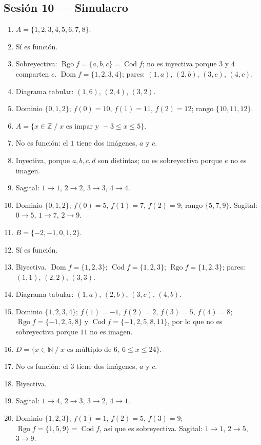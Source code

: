 \documentclass[12pt, letterpaper]{article}
\newcommand{\N}{\mathbb{N}}
\newcommand{\Z}{\mathbb{Z}}
\begin{document}
\subsection*{Sesión 10 — Simulacro}
\begin{enumerate}[leftmargin=*, label=\textbf{\arabic*.}]
  \item $A=\{1,2,3,4,5,6,7,8\}$.
  \item Sí es función.
  \item Sobreyectiva: $\operatorname{Rgo} f=\{a,b,c\}=\operatorname{Cod} f$; no es inyectiva porque $3$ y $4$ comparten $c$. $\operatorname{Dom} f=\{1,2,3,4\}$; pares: $(1,a)$, $(2,b)$, $(3,c)$, $(4,c)$.
  \item Diagrama tabular: $(1,6)$, $(2,4)$, $(3,2)$.
  \item Dominio $\{0,1,2\}$; $f(0)=10$, $f(1)=11$, $f(2)=12$; rango $\{10,11,12\}$.
  \item $A=\{x\in\Z \;/\; x \text{ es impar y } -3\le x\le 5\}$.
  \item No es función: el $1$ tiene dos imágenes, $a$ y $c$.
  \item Inyectiva, porque $a,b,c,d$ son distintas; no es sobreyectiva porque $e$ no es imagen.
  \item Sagital: $1\to1$, $2\to2$, $3\to3$, $4\to4$.
  \item Dominio $\{0,1,2\}$; $f(0)=5$, $f(1)=7$, $f(2)=9$; rango $\{5,7,9\}$. Sagital: $0\to5$, $1\to7$, $2\to9$.
  \item $B=\{-2,-1,0,1,2\}$.
  \item Sí es función.
  \item Biyectiva. $\operatorname{Dom} f=\{1,2,3\}$; $\operatorname{Cod} f=\{1,2,3\}$; $\operatorname{Rgo} f=\{1,2,3\}$; pares: $(1,1)$, $(2,2)$, $(3,3)$.
  \item Diagrama tabular: $(1,a)$, $(2,b)$, $(3,c)$, $(4,b)$.
  \item Dominio $\{1,2,3,4\}$; $f(1)=-1$, $f(2)=2$, $f(3)=5$, $f(4)=8$; $\operatorname{Rgo} f=\{-1,2,5,8\}$ y $\operatorname{Cod} f=\{-1,2,5,8,11\}$, por lo que no es sobreyectiva porque $11$ no es imagen.
  \item $D=\{x\in\N \;/\; x \text{ es múltiplo de } 6,\ 6\le x\le 24\}$.
  \item No es función: el $3$ tiene dos imágenes, $a$ y $c$.
  \item Biyectiva.
  \item Sagital: $1\to4$, $2\to3$, $3\to2$, $4\to1$.
  \item Dominio $\{1,2,3\}$; $f(1)=1$, $f(2)=5$, $f(3)=9$; $\operatorname{Rgo} f=\{1,5,9\}=\operatorname{Cod} f$, así que es sobreyectiva. Sagital: $1\to1$, $2\to5$, $3\to9$.
\end{enumerate}
\end{document}
